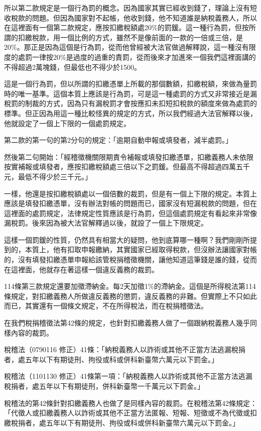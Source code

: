 \documentclass[]{ctexbook}
\begin{document}
所以第二款規定是一個行為罰的概念。因為國家其實已經收到錢了，理論上沒有短收稅款的問題。但因為國家對不起帳，他收到錢，他不知道誰是納稅義務人，所以在這裡面有一個第二款規定，應按扣繳稅額處20\%的罰鍰。這一種行為罰，但按所謂的扣繳稅款，用一個比例的方式，雖然不是像前面的一款的一倍或三倍，是20\%。那正是因為這個是行為罰，從而他曾經被大法官做過解釋說，這一種沒有限度的處罰一律按20\%是過度的過重的責罰，從而後來才加進來一個我們這裡面講的不得超過2萬塊錢，但最低也不得少於1500。

這是一個行為罰，但以所謂的扣繳憑單上所載的那個數額，扣繳稅額，來做為量罰時的唯一基準。這個本質上應該是行為罰，可是這一種處罰的方式又非常接近是漏稅罰的制裁的方式，因為只有漏稅罰才會按應扣未扣短扣稅款的額度來做為處罰的標準。但正因為用這一種比較怪異的規定的方式，所以我們經過大法官解釋以後，他就設定了一個上下限的一個處罰規定。

第二款的第一句的第2分句的規定：「逾期自動申報或填發者，減半處罰。」

然後第二句開始：「經稽徵機關限期責令補報或填發扣繳憑單，扣繳義務人未依限按實補報或填發者，應按扣繳稅額處三倍以下之罰鍰。但最高不得超過四萬五千元，最低不得少於三千元。」

一樣，他還是按扣繳稅額處以一個倍數的裁罰，但是有一個上下限的規定。本質上應該是填發扣繳憑單，沒有辦法對帳的問題而已，國家沒有短漏稅款的問題，但在這裡面的處罰規定，法律規定性質應該是行為罰，但這個處罰規定有看起來非常像漏稅罰。後來因為被大法官解釋過以後，就設了一個上下限規定。

這樣一個罰鍰的性質，仍然具有相當大的疑問，他到底算哪一種啊？我們剛剛所提到的，本質上，他有扣取申報繳納，其實國家已經取得稅款，但沒辦法讓國家對帳的，沒有填發扣繳憑單申報給該管稅捐稽徵機關，讓他知道這筆錢是誰的錢，從而在這裡面，他就存在著這樣一個違反義務的裁罰。

114條第三款規定還要加徵滯納金。每2天加徵1\%的滯納金。這個是所得稅法第114條規定，對扣繳義務人所做違反義務的懲罰，違反義務的非難。但實際上不只如此而已，其實還有一個條文規定，不在所得稅法，而在稅捐稽徵法。

在我們稅捐稽徵法第42條的規定，也針對扣繳義務人做了一個跟納稅義務人幾乎同樣內容的裁罰。

稅稽法（0790116 修正）41條：「納稅義務人以詐術或其他不正當方法逃漏稅捐者，處五年以下有期徒刑、拘役或科或併科新臺幣六萬元以下罰金。」

稅稽法（1101130 修正）41條第一項：「納稅義務人以詐術或其他不正當方法逃漏稅捐者，處五年以下有期徒刑，併科新臺幣一千萬元以下罰金。」

稅稽法的第42條針對扣繳義務人也做了是同樣內容的裁罰。在稅稽法第42條規定：「代徵人或扣繳義務人以詐術或其他不正當方法匿報、短報、短徵或不為代徵或扣繳稅捐者，處五年以下有期徒刑、拘役或科或併科新臺幣六萬元以下罰金。」
\end{document}
